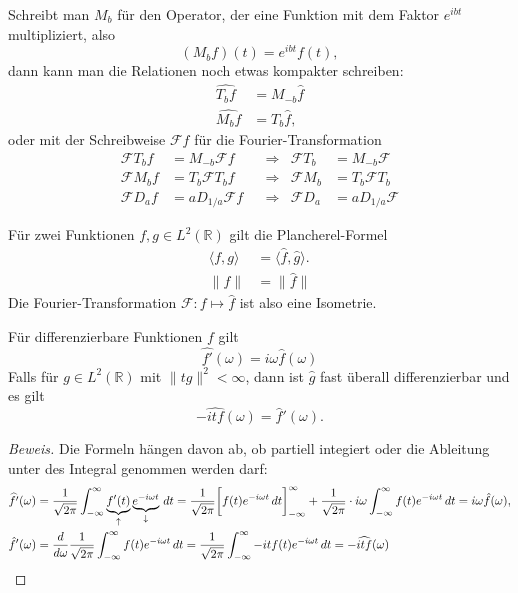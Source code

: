Schreibt man $M_b$ für den Operator, der eine Funktion mit dem
Faktor $e^{ibt}$ multipliziert, also
\[
(M_bf)(t) = e^{ibt}f(t),
\]
dann kann man die Relationen noch etwas kompakter schreiben:
\begin{align*}
\widehat{T_bf}
&=
M_{-b}\hat{f}
\\
\widehat{M_bf}
&=
T_b\hat{f},
\end{align*}
oder mit der Schreibweise $\mathcal{F}f$ für die Fourier-Transformation
\[
\begin{aligned}
\mathcal{F}T_b f &= M_{-b}\mathcal F f
&&\Rightarrow &
\mathcal{F}T_b &= M_{-b}\mathcal{F}
\\
\mathcal{F}M_b f&=T_b\mathcal{F}T_bf
&&\Rightarrow &
\mathcal{F}M_b&=T_b\mathcal{F}T_b
\\
\mathcal{F}D_af&=a D_{1/a} \mathcal F f
&&\Rightarrow &
\mathcal{F}D_a&=a D_{1/a} \mathcal F 
\end{aligned}
\]

\begin{satz}
Für zwei Funktionen $f,g\in L^2(\mathbb R)$ gilt die Plancherel-Formel
\begin{align*}
\langle f,g\rangle
&=
\langle \hat{f},\hat{g}\rangle.
\\
\|f\|&=\|\hat{f}\|
\end{align*}
Die Fourier-Transformation $\mathcal{F}\colon f\mapsto \hat{f}$ ist
also eine Isometrie.
\end{satz}

\begin{satz}
Für differenzierbare Funktionen $f$ gilt
\[
\widehat{f'}(\omega) = i\omega \hat{f}(\omega)
\]
Falls für $g\in L^2(\mathbb R)$ mit $\|tg\|^2<\infty$, dann ist $\hat{g}$
fast überall differenzierbar und es gilt
\[
-\widehat{i t f}(\omega) = \hat{f}'(\omega).
\]
\end{satz}

\begin{proof}[Beweis]
Die Formeln hängen davon ab, ob partiell integiert oder die Ableitung
unter des Integral genommen werden darf:
\begin{align*}
\widehat{f'}(\omega)
&=
\frac{1}{\sqrt{2\pi}}
\int_{-\infty}^\infty \underbrace{f'(t)}_{\uparrow}\underbrace{e^{-i\omega t}}_{\downarrow}\,dt
=
\frac{1}{\sqrt{2\pi}}
\biggl[
f(t)e^{-i\omega t}\,dt
\biggr]_{-\infty}^\infty
+
\frac{1}{\sqrt{2\pi}}
\cdot
i\omega
\int_{-\infty}^\infty f(t)e^{-i\omega t}\,dt
=
i\omega\hat{f}(\omega),
\\
\hat{f}'(\omega)
&=
\frac{d}{d\omega}
\frac{1}{\sqrt{2\pi}} \int_{-\infty}^\infty
f(t) e^{-i\omega t}\,dt
=
\frac{1}{\sqrt{2\pi}} \int_{-\infty}^\infty
-it f(t) e^{-i\omega t}\,dt
=
-\widehat{itf}(\omega)
\qedhere
\end{align*}
\end{proof}


